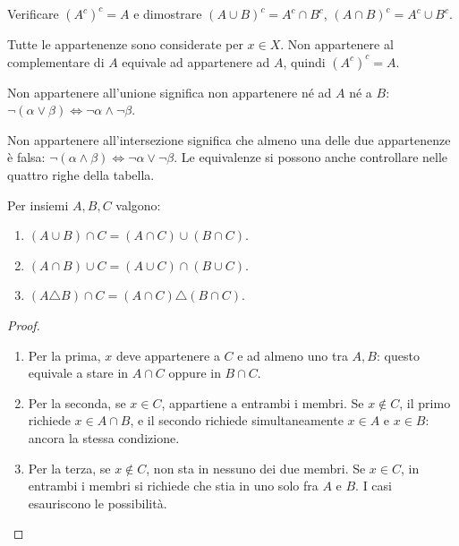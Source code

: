 \begin{esercizio}
Verificare $(A^c)^c=A$ e dimostrare $(A\cup B)^c=A^c\cap B^c$, $(A\cap B)^c=A^c\cup B^c$.
\end{esercizio}
\begin{svolgimento}
Tutte le appartenenze sono considerate per $x\in X$. Non appartenere al complementare di $A$ equivale ad appartenere ad $A$, quindi $(A^c)^c=A$.

 Non appartenere all'unione significa non appartenere né ad $A$ né a $B$: $\neg(\alpha\lor\beta)\iff\neg\alpha\land\neg\beta$.

 Non appartenere all'intersezione significa che almeno una delle due appartenenze è falsa: $\neg(\alpha\land\beta)\iff\neg\alpha\lor\neg\beta$. Le equivalenze si possono anche controllare nelle quattro righe della tabella.
\end{svolgimento}

\begin{proposizione}[Distributività]
Per insiemi $A,B,C$ valgono:
\begin{enumerate}[label=\arabic*.]
\item $(A\cup B)\cap C=(A\cap C)\cup(B\cap C)$.
\item $(A\cap B)\cup C=(A\cup C)\cap(B\cup C)$.
\item $(A\triangle B)\cap C=(A\cap C)\triangle(B\cap C)$.
\end{enumerate}
\end{proposizione}
\begin{proof}
\begin{enumerate}[label=\arabic*.]
\item Per la prima, $x$ deve appartenere a $C$ e ad almeno uno tra $A,B$: questo equivale a stare in $A\cap C$ oppure in $B\cap C$.
\item Per la seconda, se $x\in C$, appartiene a entrambi i membri. Se $x\notin C$, il primo richiede $x\in A\cap B$, e il secondo richiede simultaneamente $x\in A$ e $x\in B$: ancora la stessa condizione.
\item Per la terza, se $x\notin C$, non sta in nessuno dei due membri. Se $x\in C$, in entrambi i membri si richiede che stia in uno solo fra $A$ e $B$. I casi esauriscono le possibilità.
\end{enumerate}
\end{proof}

